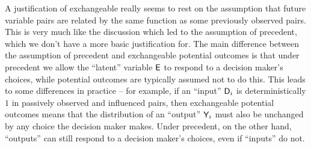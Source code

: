 A justification of exchangeable really seems to rest on the assumption that future variable pairs are related by the same function as some previously observed pairs. This is very much like the discussion which led to the assumption of precedent, which we don't have a more basic justification for. The main difference between the assumption of precedent and exchangeable potential outcomes is that under precedent we allow the ``latent'' variable $\mathsf{E}$ to respond to a decision maker's choices, while potential outcomes are typically assumed not to do this. This leads to some differences in practice -- for example, if an ``input'' $\mathsf{D}_i$ is deterministically $1$ in passively observed and influenced pairs, then exchangeable potential outcomes means that the distribution of an ``output'' $\mathsf{Y}_i$ must also be unchanged by any choice the decision maker makes. Under precedent, on the other hand, ``outputs'' can still respond to a decision maker's choices, even if ``inputs'' do not.




